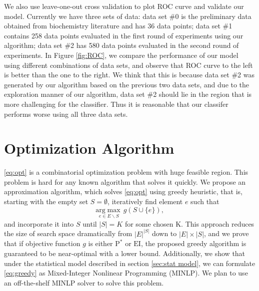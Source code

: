 \documentclass[12pt]{article}
\newcommand{\EI}{\mathrm{EI}}
\newcommand{\PI}{\text{P}^*}
\begin{document}
We also use leave-one-out cross validation to plot ROC curve and validate our model. Currently we have three sets of data: data set \#0 is the preliminary data obtained from biochemistry literature and has 36 data points; data set \#1 contains 258 data points evaluated in the first round of experiments using our algorithm; data set \#2 has 580 data points evaluated in the second round of experiments. In Figure \ref{fig:ROC}, we compare the performance of our model using different combinations of data sets, and observe that ROC curve to the left is better than the one to the right. We think that this is because data set \#2 was generated by our algorithm based on the previous two data sets, and due to the exploration manner of our algorithm, data set \#2 should lie in the region that is more challenging for the classifier. Thus it is reasonable that our classifer performs worse using all three data sets. 

\section{Optimization Algorithm}
\eqref{eq:opt} is a combinatorial optimization problem with huge feasible region. This problem is hard for any known algorithm that solves it quickly. We propose an approximation algorithm, which solves \eqref{eq:opt} using greedy heuristic, that is, starting with the empty set $S=\emptyset$, iteratively find element $e$ such that 
\begin{equation} \label{eq:greedy}
  \underset{e \in E \backslash S}{\mathrm{arg}\max} \,g(S \cup \{e\}),
\end{equation}
and incorporate it into $S$ until $|S|=K$ for some chosen K. This approach reduces the size of search space dramatically from $|E|^{|S|}$ down to $|E| \times |S|$, and we prove that if objective function $g$ is either $\PI$ or $\EI$, the proposed greedy algorithm is guaranteed to be near-optimal with a lower bound. Additionally, we show that under the statistical model described in section \ref{sec:stat model}, we can formulate \eqref{eq:greedy} as Mixed-Integer Nonlinear Programming
(MINLP). We plan to use an off-the-shelf MINLP solver to solve this problem.
\end{document}
